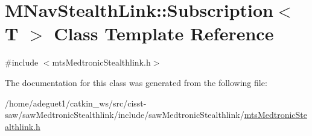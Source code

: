 \hypertarget{class_m_nav_stealth_link_1_1_subscription}{\section{M\-Nav\-Stealth\-Link\-:\-:Subscription$<$ T $>$ Class Template Reference}
\label{class_m_nav_stealth_link_1_1_subscription}
}


{\ttfamily \#include $<$mts\-Medtronic\-Stealthlink.\-h$>$}



The documentation for this class was generated from the following file\-:\begin{DoxyCompactItemize}
\item 
/home/adeguet1/catkin\-\_\-ws/src/cisst-\/saw/saw\-Medtronic\-Stealthlink/include/saw\-Medtronic\-Stealthlink/\hyperlink{mts_medtronic_stealthlink_8h}{mts\-Medtronic\-Stealthlink.\-h}\end{DoxyCompactItemize}
